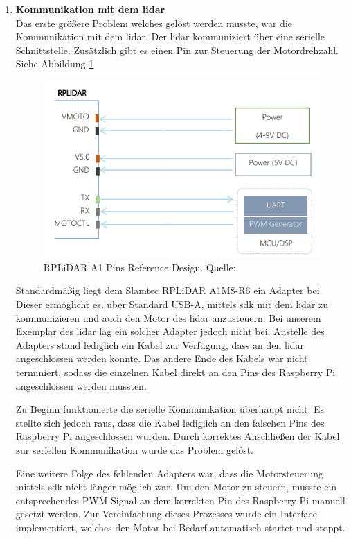 \begin{enumerate}[leftmargin=*]
    \item \textbf{Kommunikation mit dem \ac{lidar}} \\
    Das erste größere Problem welches gelöst werden musste, war die Kommunikation mit dem \ac{lidar}.
    Der \ac{lidar} kommuniziert über eine serielle Schnittstelle.
    Zusätzlich gibt es einen Pin zur Steuerung der Motordrehzahl. 
    Siehe Abbildung \ref{fig:lidar_pins}

    \begin{figure}[H]
        \centering
        \includegraphics[width=12cm]{graphics/lidar_pin_layout.png}
        \caption{RPLiDAR A1 Pins Reference Design. Quelle: \cite[p. 12]{Slamtec2023} }
        \label{fig:lidar_pins}
    \end{figure}

    Standardmäßig liegt dem Slamtec RPLiDAR A1M8-R6 ein Adapter bei.
    Dieser ermöglicht es, über Standard USB-A, mittels \ac{sdk} mit dem \ac{lidar} zu kommunizieren und auch den Motor des \ac{lidar} anzusteuern.
    Bei unserem Exemplar des \ac{lidar} lag ein solcher Adapter jedoch nicht bei.
    Anstelle des Adapters stand lediglich ein Kabel zur Verfügung, dass an den \ac{lidar} angeschlossen werden konnte.
    Das andere Ende des Kabels war nicht terminiert, sodass die einzelnen Kabel direkt an den Pins des Raspberry Pi angeschlossen werden mussten.

    Zu Beginn funktionierte die serielle Kommunikation überhaupt nicht.
    Es stellte sich jedoch raus, dass die Kabel lediglich an den falschen Pins des Raspberry Pi angeschlossen wurden.
    Durch korrektes Anschließen der Kabel zur seriellen Kommunikation wurde das Problem gelöst.

    Eine weitere Folge des fehlenden Adapters war, dass die Motorsteuerung mittels \ac{sdk} nicht länger möglich war.
    Um den Motor zu steuern, musste ein entsprechendes PWM-Signal an dem korrekten Pin des Raspberry Pi manuell gesetzt werden.
    Zur Vereinfachung dieses Prozesses wurde ein Interface implementiert, welches den Motor bei Bedarf automatisch startet und stoppt.


\end{enumerate}
